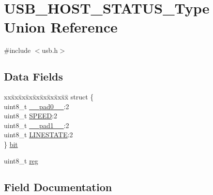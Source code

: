 \hypertarget{union_u_s_b___h_o_s_t___s_t_a_t_u_s___type}{}\section{U\+S\+B\+\_\+\+H\+O\+S\+T\+\_\+\+S\+T\+A\+T\+U\+S\+\_\+\+Type Union Reference}
\label{union_u_s_b___h_o_s_t___s_t_a_t_u_s___type}


{\ttfamily \#include $<$usb.\+h$>$}

\subsection*{Data Fields}
\begin{DoxyCompactItemize}
\item 
\begin{tabbing}
xx\=xx\=xx\=xx\=xx\=xx\=xx\=xx\=xx\=\kill
struct \{\\
\>uint8\_t \mbox{\hyperlink{union_u_s_b___h_o_s_t___s_t_a_t_u_s___type_a8b4eebe79ded0459acec2f4950102ba3}{\_\_pad0\_\_}}:2\\
\>uint8\_t \mbox{\hyperlink{union_u_s_b___h_o_s_t___s_t_a_t_u_s___type_a7244b81de139c5a3f12fbb9eb8e89647}{SPEED}}:2\\
\>uint8\_t \mbox{\hyperlink{union_u_s_b___h_o_s_t___s_t_a_t_u_s___type_a77f12d2e278bd5c07712648ac0df5e08}{\_\_pad1\_\_}}:2\\
\>uint8\_t \mbox{\hyperlink{union_u_s_b___h_o_s_t___s_t_a_t_u_s___type_a5b8b99efdbf90cbb8e924f2fece19dfc}{LINESTATE}}:2\\
\} \mbox{\hyperlink{union_u_s_b___h_o_s_t___s_t_a_t_u_s___type_a4674b3460ce6c0789a550114ed957dcd}{bit}}\\

\end{tabbing}\item 
uint8\+\_\+t \mbox{\hyperlink{union_u_s_b___h_o_s_t___s_t_a_t_u_s___type_a9428adc9af4653a2050e2536b55dec8d}{reg}}
\end{DoxyCompactItemize}


\subsection{Field Documentation}
\mbox{\label{union_u_s_b___h_o_s_t___s_t_a_t_u_s___type_a8b4eebe79ded0459acec2f4950102ba3}} 
